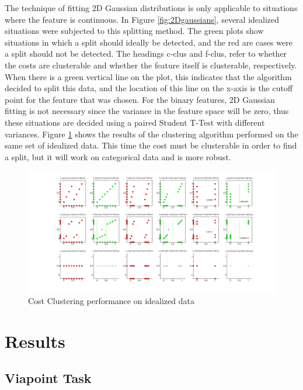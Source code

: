 \documentclass[12pt]{article}
\begin{document}
The technique of fitting 2D Gaussian distributions is only applicable to situations where the feature is continuous. In Figure \ref{fig:2Dgaussians}, several idealized situations were subjected to this splitting method. The green plots show situations in which a split should ideally be detected, and the red are cases were a split should not be detected. The headings c-clus and f-clus, refer to whether the costs are clusterable and whether the feature itself is clusterable, respectively. When there is a green vertical line on the plot, this indicates that the algorithm decided to split this data, and the location of this line on the x-axis is the cutoff point for the feature that was chosen. For the binary features, 2D Gaussian fitting is not necessary since the variance in the feature space will be zero, thus these situations are decided using a paired Student T-Test with different variances. Figure \ref{fig:clustercosts} shows the results of the clustering algorithm performed on the same set of idealized data. This time the cost must be clusterable in order to find a split, but it will work on categorical data and is more robust. 


\begin{figure}[ht]
  \centerline{
  \includegraphics[width=1.5\columnwidth]{cluster_costs.png}}
  \caption{\label{fig_cluster_costs} Cost Clustering performance on idealized data}
  \label{fig:clustercosts}
\end{figure}

\section{Results}

\subsection{Viapoint Task}
\end{document}
